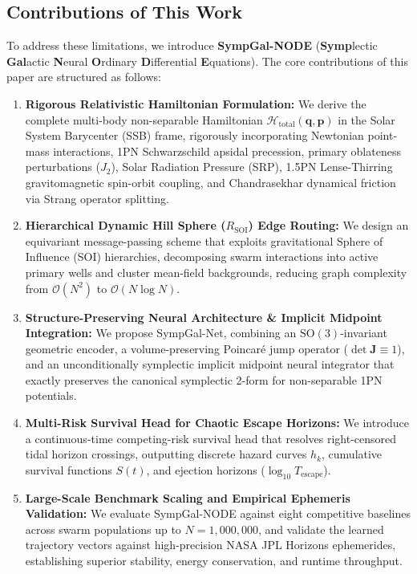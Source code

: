 \documentclass[preprint,12pt,3p]{elsarticle}
\begin{document}
\subsection{Contributions of This Work}
To address these limitations, we introduce \textbf{SympGal-NODE} (\textbf{Symp}lectic \textbf{Gal}actic \textbf{N}eural \textbf{O}rdinary \textbf{D}ifferential \textbf{E}quations). The core contributions of this paper are structured as follows:
\begin{enumerate}
    \item \textbf{Rigorous Relativistic Hamiltonian Formulation:} We derive the complete multi-body non-separable Hamiltonian $\mathcal{H}_{\mathrm{total}}(\bm{q}, \bm{p})$ in the Solar System Barycenter (SSB) frame, rigorously incorporating Newtonian point-mass interactions, 1PN Schwarzschild apsidal precession, primary oblateness perturbations ($J_2$), Solar Radiation Pressure (SRP), 1.5PN Lense-Thirring gravitomagnetic spin-orbit coupling, and Chandrasekhar dynamical friction via Strang operator splitting.
    \item \textbf{Hierarchical Dynamic Hill Sphere ($R_{\mathrm{SOI}}$) Edge Routing:} We design an equivariant message-passing scheme that exploits gravitational Sphere of Influence (SOI) hierarchies, decomposing swarm interactions into active primary wells and cluster mean-field backgrounds, reducing graph complexity from $\mathcal{O}(N^2)$ to $\mathcal{O}(N \log N)$.
    \item \textbf{Structure-Preserving Neural Architecture \& Implicit Midpoint Integration:} We propose SympGal-Net, combining an $\mathrm{SO}(3)$-invariant geometric encoder, a volume-preserving Poincaré jump operator ($\det \bm{J} \equiv 1$), and an unconditionally symplectic implicit midpoint neural integrator that exactly preserves the canonical symplectic 2-form for non-separable 1PN potentials.
    \item \textbf{Multi-Risk Survival Head for Chaotic Escape Horizons:} We introduce a continuous-time competing-risk survival head that resolves right-censored tidal horizon crossings, outputting discrete hazard curves $h_k$, cumulative survival functions $S(t)$, and ejection horizons ($\log_{10} T_{\mathrm{escape}}$).
    \item \textbf{Large-Scale Benchmark Scaling and Empirical Ephemeris Validation:} We evaluate SympGal-NODE against eight competitive baselines across swarm populations up to $N = 1,000,000$, and validate the learned trajectory vectors against high-precision NASA JPL Horizons ephemerides, establishing superior stability, energy conservation, and runtime throughput.
\end{enumerate}
\end{document}
